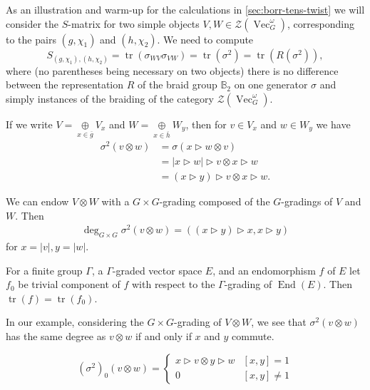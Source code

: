 \documentclass[11pt]{book}
\theoremstyle{Rem}
\theoremstyle{definition}
\numberwithin{equation}{section}
\newcommand\tr{\operatorname{tr}}
\newcommand\End{\operatorname{End}}
\newcommand\hit{\triangleright}
\newcommand\ot{\otimes}
\newcommand\Vect{\operatorname{Vec}}
\newcommand\CTR{\mathcal Z}
\begin{document}
As an illustration and warm-up for the calculations in \cref{sec:borr-tens-twist} we will consider the $S$-matrix for two simple objects $V,W\in\mathcal{Z}(\Vect^\omega_G)$, corresponding to the pairs $(g,\chi_1)$ and $(h, \chi_2)$. We need to compute
\begin{equation*}
  S_{(g,\chi_1),(h,\chi_2)}=\tr(\sigma_{WV}\sigma_{VW})=\tr(\sigma^2)=\tr(R(\sigma^2)),
\end{equation*}
where (no parentheses being necessary on two objects) there is no difference between the representation $R$ of the braid group $\mathbb B_2$ on one generator $\sigma$ and simply instances of the braiding of the category $\CTR(\Vect_G^\omega)$.

If we write $V = \underset{x\in \overline{g}}\oplus V_x$ and $W = \underset{x\in \overline{h}}\oplus W_y$, then for $  v\in V_x$ and $  w\in W_y$ we have
\begin{align*}
  \sigma^2(  v\ot  w)&=\sigma(x\hit   w\ot   v)\\
  &=|x {\hit}  w|\hit   v\ot x\hit   w\\
  &=(x\hit y) \hit   v\ot x\hit  w.
\end{align*}

We can endow $V\ot W$ with a $G\times G$-grading composed of the $G$-gradings of $V$ and $W$. Then
\begin{align*}
  \deg_{G\times G}\sigma^2(v\ot w)=((x\hit y) \hit x,x \hit y)
\end{align*}
for $x=|v|,y=|w|$.

For a finite group $\Gamma$, a $\Gamma$-graded vector space $E$, and an endomorphism $f$ of $E$ let $f_0$ be trivial component of $f$ with respect to the $\Gamma$-grading of $\End(E)$. Then $\tr(f)=\tr(f_0)$.

In our example, considering the $G\times G$-grading of $V\ot W$, we see that $\sigma^2( v\ot  w)$ has the same degree as $v\ot w$ if and only if $x$ and $y$ commute.

\begin{equation} \label{degree condition}
(\sigma^2)_0(v\ot w) = \begin{cases} 
          x\hit v\ot y\hit  w & [x,y]=1 \\
          0 & [x,y] \neq 1 
       \end{cases}
\end{equation}
\end{document}
